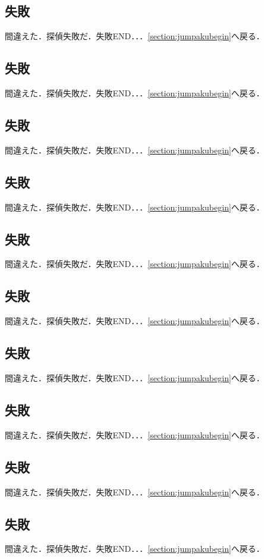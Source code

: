 \subsection{失敗}\label{section:jumpakufailure6}間違えた．探偵失敗だ．失敗END．．．\ref{section:jumpakubegin}へ戻る．\newpage
\subsection{失敗}\label{section:jumpakufailure7}間違えた．探偵失敗だ．失敗END．．．\ref{section:jumpakubegin}へ戻る．\newpage
\subsection{失敗}\label{section:jumpakufailure8}間違えた．探偵失敗だ．失敗END．．．\ref{section:jumpakubegin}へ戻る．\newpage
\subsection{失敗}\label{section:jumpakufailure9}間違えた．探偵失敗だ．失敗END．．．\ref{section:jumpakubegin}へ戻る．\newpage
\subsection{失敗}\label{section:jumpakufailure10}間違えた．探偵失敗だ．失敗END．．．\ref{section:jumpakubegin}へ戻る．\newpage
\subsection{失敗}\label{section:jumpakufailure11}間違えた．探偵失敗だ．失敗END．．．\ref{section:jumpakubegin}へ戻る．\newpage
\subsection{失敗}\label{section:jumpakufailure12}間違えた．探偵失敗だ．失敗END．．．\ref{section:jumpakubegin}へ戻る．\newpage
\subsection{失敗}\label{section:jumpakufailure13}間違えた．探偵失敗だ．失敗END．．．\ref{section:jumpakubegin}へ戻る．\newpage
\subsection{失敗}\label{section:jumpakufailure14}間違えた．探偵失敗だ．失敗END．．．\ref{section:jumpakubegin}へ戻る．\newpage
\subsection{失敗}\label{section:jumpakufailure15}間違えた．探偵失敗だ．失敗END．．．\ref{section:jumpakubegin}へ戻る．\newpage
